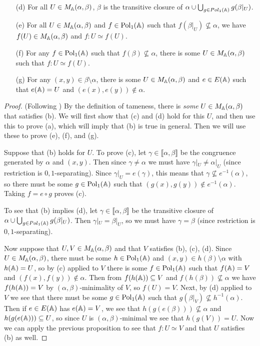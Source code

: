 \begin{appendices}
\begin{thm}
\begin{itemize}
\item[(d)] For all $U \in M_{\mathbb{A}}(\alpha, \beta)$, $\beta$ is the transitive closure of $\alpha \cup \bigcup_{g \in Pol_1(\mathbb{A})} g(\beta|_U)$.

\item[(e)] For all $U \in M_{\mathbb{A}}(\alpha, \beta)$ and $f \in \operatorname{Pol}_1(\mathbb{A})$ such that $f(\beta|_U) \not\subseteq \alpha$, we have $f(U) \in M_{\mathbb{A}}(\alpha, \beta)$ and $f : U \simeq f(U)$.

\item[(f)] For any $f \in \operatorname{Pol}_1(\mathbb{A})$ such that $f(\beta) \not\subseteq \alpha$, there is some $U \in M_{\mathbb{A}}(\alpha,\beta)$ such that $f : U \simeq f(U)$.

\item[(g)] For any $(x,y) \in \beta\setminus\alpha$, there is some $U \in M_{\mathbb{A}}(\alpha, \beta)$ and $e \in E(\mathbb{A})$ such that $e(\mathbb{A}) = U$ and $(e(x), e(y)) \not\in \alpha$.
\end{itemize}
\end{thm}
\begin{proof} (Following \cite{hobby-mckenzie}) By the definition of tameness, there is \emph{some} $U \in M_{\mathbb{A}}(\alpha, \beta)$ that satisfies (b). We will first show that (c) and (d) hold for this $U$, and then use this to prove (a), which will imply that (b) is true in general. Then we will use these to prove (e), (f), and (g).

Suppose that (b) holds for $U$. To prove (c), let $\gamma \in \llbracket \alpha, \beta \rrbracket$ be the congruence generated by $\alpha$ and $(x,y)$. Then since $\gamma \ne \alpha$ we must have $\gamma|_U \ne \alpha|_U$ (since restriction is $0,1$-separating). Since $\gamma|_U = e(\gamma)$, this means that $\gamma \not\subseteq e^{-1}(\alpha)$, so there must be some $g \in \operatorname{Pol}_1(\mathbb{A})$ such that $(g(x), g(y)) \not\in e^{-1}(\alpha)$. Taking $f = e\circ g$ proves (c).

To see that (b) implies (d), let $\gamma \in \llbracket \alpha, \beta \rrbracket$ be the transitive closure of $\alpha \cup \bigcup_{g \in Pol_1(\mathbb{A})} g(\beta|_U)$. Then $\gamma|_U = \beta|_U$, so we must have $\gamma = \beta$ (since restriction is $0,1$-separating).

Now suppose that $U,V \in M_{\mathbb{A}}(\alpha, \beta)$ and that $V$ satisfies (b), (c), (d). Since $U \in M_{\mathbb{A}}(\alpha,\beta)$, there must be some $h \in \operatorname{Pol}_1(\mathbb{A})$ and $(x,y) \in h(\beta) \setminus \alpha$ with $h(\mathbb{A}) = U$, so by (c) applied to $V$ there is some $f \in \operatorname{Pol}_1(\mathbb{A})$ such that $f(\mathbb{A}) = V$ and $(f(x), f(y)) \not\in \alpha$. Then from $f(h(\mathbb{A})) \subseteq V$ and $f(h(\beta)) \not\subseteq \alpha$ we have $f(h(\mathbb{A})) = V$ by $(\alpha,\beta)$-minimality of $V$, so $f(U) = V$. Next, by (d) applied to $V$ we see that there must be some $g \in \operatorname{Pol}_1(\mathbb{A})$ such that $g(\beta|_V) \not\subseteq h^{-1}(\alpha)$. Then if $e \in E(\mathbb{A})$ has $e(\mathbb{A}) = V$, we see that $h(g(e(\beta))) \not\subseteq \alpha$ and $h(g(e(\mathbb{A}))) \subseteq U$, so since $U$ is $(\alpha,\beta)$-minimal we see that $h(g(V)) = U$. Now we can apply the previous proposition to see that $f : U \simeq V$ and that $U$ satisfies (b) as well.


\end{proof}
\end{appendices}
